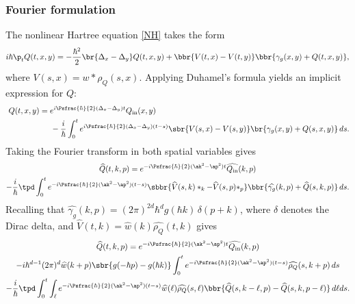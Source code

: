 \subsubsection{Fourier formulation}
The nonlinear Hartree equation \eqref{NH} takes the form
\begin{align*}
i\hbar\p_tQ(t,x,y)=-{\frac{\hbar^2}{2}}\br{\Delta_x-\Delta_y}Q(t,x,y)+\bbr{V(t,x)-V(t,y)}\bbr{\gamma_g(x,y)+Q(t,x,y)},
\end{align*}where $V(s,x)=w*\rho_Q(s,x)$.
Applying Duhamel's formula yields an implicit expression for $Q$:
\begin{align*}\begin{split}\
Q(t,x,y)&=e^{i{\Psfrac{\hbar}{2}} (\Delta_x-\Delta_y)t}Q_{\mathrm{in}}(x,y)\\
&\hspace{0.5cm}-
\frac{i}{\hbar}\int_0^te^{i{\Psfrac{\hbar}{2}}(\Delta_x-\Delta_y)(t-s)}\sbr{V(s,x)-V(s,y)}\br{\gamma_g(x,y)+Q(s,x,y)}\,ds.\end{split}
\end{align*}
Taking the Fourier transform in both spatial variables gives
\begin{multline*}
\widehat Q(t,k,p)=e^{-i{\Psfrac{\hbar}{2}}(\ak^2-\ap^2)t}\widehat{Q_{\mathrm{in}}}(k,p)\\
-\frac{i}{\hbar}\tpd\int_0^te^{-i{\Psfrac{\hbar}{2}}(\ak^2-\ap^2)(t-s)}\sbbr{\widehat V(s,k)*_k-\widehat V(s,p)*_p}\bbr{\widehat{\gamma_g}(k,p)+\widehat{Q}(s,k,p)}\,ds.
\end{multline*}
Recalling that $\widehat{\gamma_g}(k,p)=(2\pi)^{2d}\hbar^d g(\hbar k)\,\delta(p+k)$, where $\delta$ denotes the Dirac delta, and $\widehat V(t,k)=\widehat w(k)\widehat{\rho_Q}(t,k)$ gives
\begin{multline*}
\widehat Q(t,k,p)=e^{-i{\Psfrac{\hbar}{2}}(\ak^2-\ap^2)t}\widehat{Q_{\mathrm{in}}}(k,p)\\
-i\hbar^{d-1}(2\pi)^d\widehat w(k+p)\sbr{g(-\hbar p)-g(\hbar k)}\int_0^te^{-i{\Psfrac{\hbar}{2}}(\ak^2-\ap^2)(t-s)}\widehat{\rho_Q}(s,k+p)\,ds\\
-\frac{i}{\hbar}\tpd\int_0^t\int_\ell e^{-i{\Psfrac{\hbar}{2}}(\ak^2-\ap^2)(t-s)}\widehat w(\ell )\widehat{\rho_Q}(s,\ell )\bbr{\widehat{Q}(s,k-\ell ,p)-\widehat{Q}(s,k,p-\ell )}\,d\ell ds.
\end{multline*}

